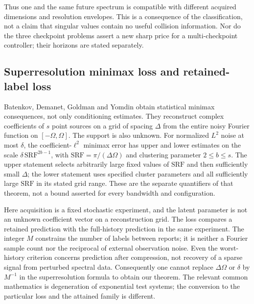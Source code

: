 Thus one and the same future spectrum is compatible with different
acquired dimensions and resolution envelopes. This is a consequence
of the classification, not a claim that singular values contain no
useful collision information. Nor do the three checkpoint problems
assert a new sharp price for a multi-checkpoint controller; their
horizons are stated separately.

\subsection{Superresolution minimax loss and retained-label loss}
Batenkov, Demanet, Goldman and Yomdin
\cite[Definition 3.13 and Theorem 3.14]{BDGY2020} obtain statistical
minimax consequences, not only conditioning estimates. They reconstruct
complex coefficients of $s$ point sources on a grid of spacing
$\Delta$ from the entire noisy Fourier function on $[-\Omega,\Omega]$.
The support is also unknown. For normalized $L^2$ noise at most
$\delta$, the coefficient-$\ell^2$
minimax error has upper and lower estimates on the scale
$\delta\,\mathrm{SRF}^{2b-1}$, with
$\mathrm{SRF}=\pi/(\Delta\Omega)$ and clustering parameter $2\le b\le s$.
The upper statement selects arbitrarily large fixed values of
$\mathrm{SRF}$ and then sufficiently small $\Delta$; the lower
statement uses specified cluster parameters and all sufficiently
large $\mathrm{SRF}$ in its stated grid range. These are the separate
quantifiers of that theorem, not a bound asserted for every bandwidth
and configuration.

Here acquisition is a fixed stochastic experiment, and the latent
parameter is not an unknown coefficient vector on a reconstruction
grid. The loss compares a retained prediction with the full-history
prediction in the same experiment. The integer $M$ constrains the
number of labels between reports; it is neither a Fourier sample
count nor the reciprocal of external observation noise. Even the
worst-history criterion concerns prediction after compression, not
recovery of a sparse signal from perturbed spectral data. Consequently
one cannot replace $\Delta\Omega$ or $\delta$ by $M^{-1}$ in the
superresolution formula to obtain our theorem. The relevant common
mathematics is degeneration of exponential test systems; the conversion
to the particular loss and the attained family is different.

